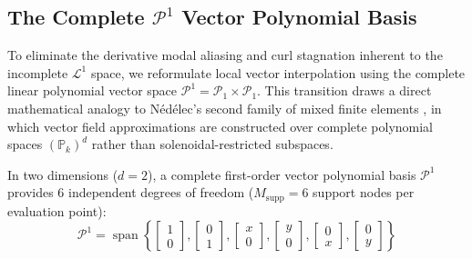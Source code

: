 \documentclass[preprint,12pt]{elsarticle}
\begin{document}
\subsection{The Complete $\mathcal{P}^1$ Vector Polynomial Basis}
\label{subsec:complete_P1_basis}

To eliminate the derivative modal aliasing and curl stagnation inherent to the incomplete $\mathcal{L}^1$ space, we reformulate local vector interpolation using the complete linear polynomial vector space $\mathcal{P}^1 = \mathcal{P}_1 \times \mathcal{P}_1$. This transition draws a direct mathematical analogy to Nédélec's second family of mixed finite elements \cite{nedelec1986new}, in which vector field approximations are constructed over complete polynomial spaces $(\mathbb{P}_k)^d$ rather than solenoidal-restricted subspaces.

In two dimensions ($d=2$), a complete first-order vector polynomial basis $\mathcal{P}^1$ provides 6 independent degrees of freedom ($M_{\mathrm{supp}} = 6$ support nodes per evaluation point):
\begin{equation}
\mathcal{P}^1 = \operatorname{span} \left\{ 
\begin{bmatrix} 1 \\ 0 \end{bmatrix}, 
\begin{bmatrix} 0 \\ 1 \end{bmatrix}, 
\begin{bmatrix} x \\ 0 \end{bmatrix}, 
\begin{bmatrix} y \\ 0 \end{bmatrix}, 
\begin{bmatrix} 0 \\ x \end{bmatrix}, 
\begin{bmatrix} 0 \\ y \end{bmatrix} 
\right\}
\label{eq:complete_P1_basis_vectors}
\end{equation}
\end{document}

